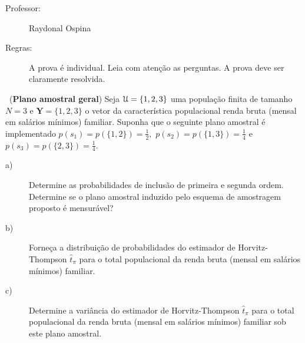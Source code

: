 \documentclass[a4paper,11pt,oneside,twocolumn]{Config/milktest}
\begin{document}
\beb
{\small
\begin{description}
\item[Professor:] Raydonal Ospina

\item[Regras:] A prova é individual. Leia com atenção as perguntas. A prova deve ser claramente resolvida. 

\end{description}
}
\eeb

\balance



\medskip 
\question~({\bf Plano amostral geral})    Seja 
${\cal U}=\{1,2,3\}$ uma população finita de tamanho $N=3$ e $\mathbf{Y} =\{1,2,3\}$  o vetor da característica populacional renda bruta (mensal em salários mínimos) familiar.  Suponha que o seguinte plano amostral é implementado 
$p(s_1)=p(\{1,2\})=\frac{1}{2},$ $p(s_2)=p(\{1,3\})=\frac{1}{4}$ e
$p(s_3)=p(\{2,3\})=\frac{1}{4}.$
\begin{description}
\item[a)] Determine as probabilidades de inclusão de primeira e  segunda ordem. Determine se o plano amostral induzido pelo esquema de amostragem proposto é mensurável? 
\item[b)] Forneça a distribuição de probabilidades do estimador de Horvitz-Thompson $\hat{t}_\pi$ para o total populacional da renda bruta (mensal em salários mínimos) familiar.
\item[c)] Determine a variância do estimador de Horvitz-Thompson $\hat{t}_\pi$ para o total populacional da renda bruta (mensal em salários mínimos) familiar sob este plano amostral.
\end{description}
\end{document}
